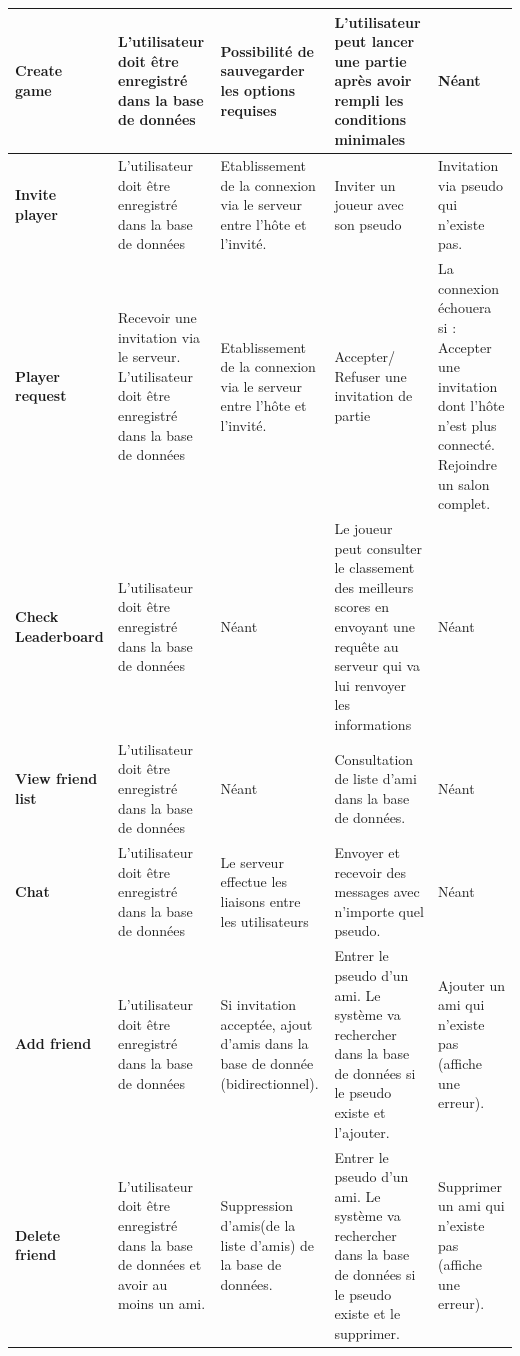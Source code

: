 \documentclass[utf8]{article}
\begin{document}
\begin{center}
\begin{longtable}{|p{}||p{}|p{}|p{}|p{}|}
\hline
\hline
\textbf{Create game}    & L'utilisateur doit être enregistré dans la base de données  & Possibilité de sauvegarder les options requises  & L'utilisateur peut lancer une partie après avoir rempli les conditions minimales  & Néant \\
\hline
\hline
\textbf{Invite player} & L'utilisateur doit être enregistré dans la base de données   & Etablissement de la connexion via le serveur entre l’hôte et l’invité. & Inviter un joueur avec son pseudo & Invitation via pseudo qui n’existe pas. \\
\hline
\hline
\textbf{Player request}  & Recevoir une invitation via le serveur.
L'utilisateur doit être enregistré dans la base de données   & Etablissement de la connexion via le serveur entre l’hôte et l’invité.  & Accepter/ Refuser une invitation de partie  & La connexion échouera si :
Accepter une invitation dont l'hôte n’est plus connecté.
Rejoindre un salon complet. \\
\hline
\hline
\textbf{Check Leaderboard}  & L'utilisateur doit être enregistré dans la base de données   & \hfill Néant  \hfill\null &Le joueur peut consulter le classement des meilleurs scores en envoyant une requête au serveur qui va lui renvoyer les informations  & Néant \\
\hline
\hline
\textbf{View friend list }   & L'utilisateur doit être enregistré dans la base de données   & Néant  & Consultation de liste d'ami dans la base de données. & Néant \\
\hline
\hline
\textbf{Chat}     & L'utilisateur doit être enregistré dans la base de données   & Le serveur effectue les liaisons entre les utilisateurs  & Envoyer et recevoir des messages avec n'importe quel pseudo.  & Néant \\
\hline
\hline
\textbf{Add friend}    & L'utilisateur doit être enregistré dans la base de données   & Si invitation acceptée, ajout d'amis dans la base de donnée (bidirectionnel).  & Entrer le pseudo d’un ami. Le système va rechercher dans la base de données si le pseudo existe et l’ajouter.  & Ajouter un ami qui n’existe pas (affiche une erreur).\\
\hline
\hline
\textbf{Delete friend}    & L'utilisateur doit être enregistré dans la base de données et avoir au moins un ami.   & Suppression d’amis(de la liste d’amis) de la base de données.  & Entrer le pseudo d’un ami. Le système va rechercher dans la base de données si le pseudo existe et le supprimer.  & Supprimer un ami qui n’existe pas (affiche une erreur). \\

\end{longtable}
\end{center}
\end{document}
